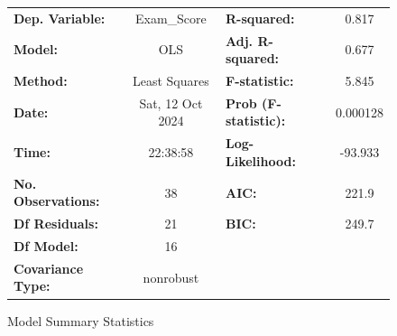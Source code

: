 \documentclass[twocolumn]{article} %
\begin{document}
\begin{figure}[ht]
  \centering
  
  \begin{subtable}{\textwidth}
    \centering
    \begin{tabular}{lclc}
      \toprule
      \textbf{Dep. Variable:}                             &   Exam\_Score    & \textbf{  R-squared:         } &     0.817   \\
      \textbf{Model:}                                     &       OLS        & \textbf{  Adj. R-squared:    } &     0.677   \\
      \textbf{Method:}                                    &  Least Squares   & \textbf{  F-statistic:       } &     5.845   \\
      \textbf{Date:}                                      & Sat, 12 Oct 2024 & \textbf{  Prob (F-statistic):} &  0.000128   \\
      \textbf{Time:}                                      &     22:38:58     & \textbf{  Log-Likelihood:    } &   -93.933   \\
      \textbf{No. Observations:}                          &          38      & \textbf{  AIC:               } &     221.9   \\
      \textbf{Df Residuals:}                              &          21      & \textbf{  BIC:               } &     249.7   \\
      \textbf{Df Model:}                                  &          16      & \textbf{                     } &             \\
      \textbf{Covariance Type:}                           &    nonrobust     & \textbf{                     } &             \\
      \bottomrule
      \end{tabular}
    \caption{Model Summary Statistics}
    \label{tab:model_summary-high}
  \end{subtable}

  \vspace{1em} %
  

\end{figure}
\end{document}
